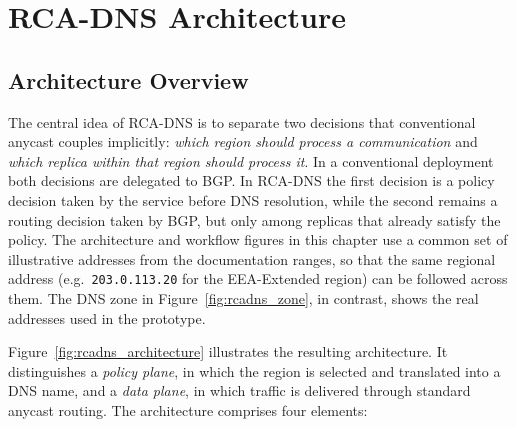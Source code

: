 \documentclass[
A4paper,                %
twoside,                %
openright,              %
chapterprefix=true,     %
12pt,                   %
headings=normal,        %
titlepage=on            %
]{book}
\begin{document}
\section{RCA-DNS Architecture}
\label{sc:rcadns_architecture}

\subsection{Architecture Overview}
\label{sc:rcadns_overview}

The central idea of RCA-DNS is to separate two decisions that conventional anycast couples implicitly: \textit{which region should process a communication} and \textit{which replica within that region should process it}. In a conventional deployment both decisions are delegated to BGP. In RCA-DNS the first decision is a policy decision taken by the service before DNS resolution, while the second remains a routing decision taken by BGP, but only among replicas that already satisfy the policy. The architecture and workflow figures in this chapter use a common set of illustrative addresses from the documentation ranges, so that the same regional address (e.g.\ \texttt{203.0.113.20} for the EEA-Extended region) can be followed across them. The DNS zone in Figure~\ref{fig:rcadns_zone}, in contrast, shows the real addresses used in the prototype.

Figure~\ref{fig:rcadns_architecture} illustrates the resulting architecture. It distinguishes a \textit{policy plane}, in which the region is selected and translated into a DNS name, and a \textit{data plane}, in which traffic is delivered through standard anycast routing. The architecture comprises four elements:
\end{document}
